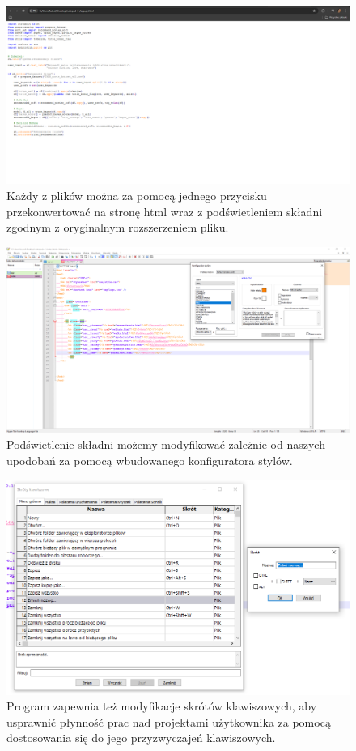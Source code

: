 \documentclass[0.82pt,a4paper]{article}
\begin{document}
    \begin{figure}[H]
        \centering
        \includegraphics[width=0.8\linewidth]{media/Notepad/notepad7.PNG}
        \caption[notepad html]{Każdy z plików można za pomocą jednego przycisku przekonwertować na stronę html wraz z podświetleniem składni zgodnym z oryginalnym rozszerzeniem pliku.}
        \label{fig:notepad_html}
    \end{figure}

    \begin{figure}[H]
        \centering
        \includegraphics[width=0.8\linewidth]{media/Notepad/notepad8.PNG}
        \caption[notepad podswietlenie kolory]{Podświetlenie składni możemy modyfikować zależnie od naszych upodobań za pomocą wbudowanego konfiguratora stylów.}
        \label{fig:notepad_kolory_skladnia}
    \end{figure}

    \begin{figure}[H]
        \centering
        \includegraphics[width=0.8\linewidth]{media/Notepad/notepad9.PNG}
        \caption[notepad skroty]{Program zapewnia też modyfikacje skrótów klawiszowych, aby usprawnić płynność prac nad projektami użytkownika za pomocą dostosowania się do jego przyzwyczajeń klawiszowych.}
        \label{fig:notepad_skroty}
    \end{figure}
\end{document}
